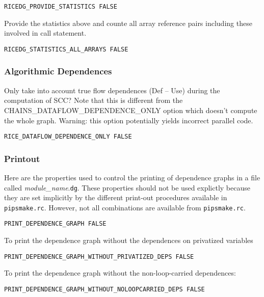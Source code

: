\begin{verbatim}
RICEDG_PROVIDE_STATISTICS FALSE
\end{verbatim}

Provide the statistics above and counte all array reference pairs
including these involved in call statement.

\begin{verbatim}
RICEDG_STATISTICS_ALL_ARRAYS FALSE
\end{verbatim}

\subsubsection{Algorithmic Dependences}

Only take into account true flow dependences (Def -- Use) during the
computation of SCC?  Note that this is different from the
CHAINS\_DATAFLOW\_DEPENDENCE\_ONLY option which doesn't compute the
whole graph.  Warning: this option potentially yields incorrect parallel
code.

\begin{verbatim}
RICE_DATAFLOW_DEPENDENCE_ONLY FALSE
\end{verbatim}

\subsubsection{Printout}

Here are the properties used to control the printing of dependence
graphs in a file called {\em module\_name}.{\tt dg}. These properties
should not be used explictly because they are set implicitly by the
different print-out procedures available in \verb/pipsmake.rc/. However,
not all combinations are available from \verb/pipsmake.rc/.

\begin{verbatim}
PRINT_DEPENDENCE_GRAPH FALSE
\end{verbatim}

To print the dependence graph without the dependences on privatized
variables 

\begin{verbatim}
PRINT_DEPENDENCE_GRAPH_WITHOUT_PRIVATIZED_DEPS FALSE
\end{verbatim}

To print the dependence graph without the non-loop-carried dependences:
 
\begin{verbatim}
PRINT_DEPENDENCE_GRAPH_WITHOUT_NOLOOPCARRIED_DEPS FALSE
\end{verbatim}

